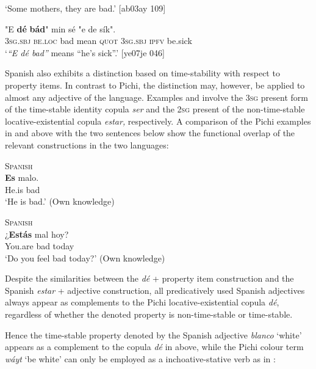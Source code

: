 \glt ‘Some mothers, they are bad.’ [ab03ay 109]
\z


\ea%
    \label{ex:key:1719}
    \gll "E    \textbf{dé}    \textbf{bád}"    min    sé    "e    de  sík".\\
\phantom{‘}\textsc{3sg.sbj}  \textsc{be.loc}  bad    mean  \textsc{quot}    \textsc{3sg.sbj}  \textsc{ipfv}  be.sick\\

\glt ‘\textit{“E dé bad”} means “he’s sick”.’ [ye07je 046]
\z

Spanish also exhibits a distinction based on time-stability with respect to property items. In contrast to Pichi, the distinction may, however, be applied to almost any adjective of the language. Examples  and  involve the \textsc{3sg} present form of the time-stable identity copula \textit{ser} and the \textsc{2sg} present of the non-time-stable locative-existential copula \textit{estar,} respectively. A comparison of the Pichi examples in  and  above with the two sentences below show the functional overlap of the relevant constructions in the two languages: 


\ea%
    \label{ex:key:1720}
\textsc{Spanish}\\
    \gll \textbf{Es}    malo.                            \\
He.is  bad\\

\glt ‘He is bad.’ (Own knowledge)
\z


\ea%
    \label{ex:key:1721}
\textsc{Spanish}\\
    \gll ¿\textbf{Estás}  mal  hoy?                          \\
You.are  bad  today\\

\glt ‘Do you feel bad today?’ (Own knowledge)
\z

Despite the similarities between the \textit{dé} + property item construction and the Spanish \textit{estar} + adjective construction, all predicatively used Spanish adjectives always appear as complements to the Pichi locative-existential copula \textit{dé}, regardless of whether the denoted property is non-time-stable or time-stable. 


Hence the time-stable property denoted by the Spanish adjective \textit{blanco} ‘white’ appears as a complement to the copula \textit{dé} in  above, while the Pichi colour term \textit{wáyt} ‘be white’ can only be employed as a inchoative-stative verb as in :



